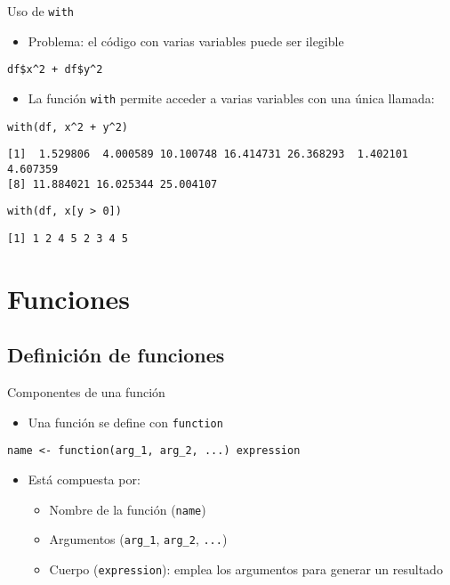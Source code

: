 \documentclass[xcolor={usenames,svgnames,dvipsnames}]{beamer}
\begin{document}
\begin{frame}[fragile,label={sec:org3505ad5}]{Uso de \texttt{with}}
 \begin{itemize}
\item Problema: el código con varias variables puede ser ilegible
\end{itemize}
\lstset{language=r,label= ,caption= ,captionpos=b,numbers=none}
\begin{lstlisting}
df$x^2 + df$y^2
\end{lstlisting}
\begin{itemize}
\item La función \texttt{with} permite acceder a varias variables con una única llamada:
\end{itemize}
\lstset{language=r,label= ,caption= ,captionpos=b,numbers=none}
\begin{lstlisting}
with(df, x^2 + y^2)
\end{lstlisting}

\begin{verbatim}
[1]  1.529806  4.000589 10.100748 16.414731 26.368293  1.402101  4.607359
[8] 11.884021 16.025344 25.004107
\end{verbatim}

\lstset{language=r,label= ,caption= ,captionpos=b,numbers=none}
\begin{lstlisting}
with(df, x[y > 0])
\end{lstlisting}

\begin{verbatim}
[1] 1 2 4 5 2 3 4 5
\end{verbatim}
\end{frame}

\section{Funciones}
\label{sec:org31c4d17}
\subsection{Definición de funciones}
\label{sec:org8fe732a}
\begin{frame}[fragile,label={sec:orga1592b8}]{Componentes de una función}
 \begin{itemize}
\item Una función se define con \texttt{function}
\end{itemize}
\begin{center}
\texttt{name <- function(arg\_1, arg\_2, ...) expression}
\end{center}
\begin{itemize}
\item Está compuesta por:
\begin{itemize}
\item Nombre de la función (\texttt{name})
\item Argumentos (\texttt{arg\_1}, \texttt{arg\_2}, \texttt{...})
\item Cuerpo (\texttt{expression}): emplea los argumentos para generar un resultado
\end{itemize}
\end{itemize}
\end{frame}
\end{document}
